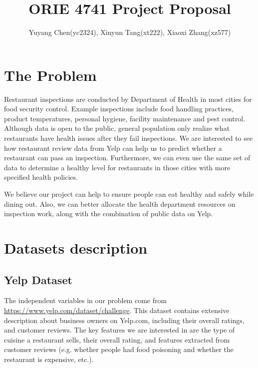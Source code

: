 \documentclass[12pt]{article}%
\begin{document}
\title{ORIE 4741 Project Proposal}
\author{Yuyang Chen(yc2324), Xinyun Tang(xt222), Xiaoxi Zhang(xz577)}
\date{}

\maketitle
\section{The Problem}
Restaurant inspections are conducted by Department of Health in most cities for food security control. Example inspections include food handling practices, product temperatures, personal hygiene, facility maintenance and pest control. Although data is open to the public, general population only realize what restaurants have health issues after they fail inspections. We are interested to see how restaurant review data from Yelp can help us to predict whether a restaurant can pass an inspection. Furthermore, we can even use the same set of data to determine a healthy level for restaurants in those cities with more specified health policies. 

We believe our project can help to ensure people can eat healthy and safely while dining out. Also, we can better allocate the health department resources on inspection work, along with the combination of public data on Yelp. 

\section{Datasets description}

\subsection{Yelp Dataset}
The independent variables in our problem come from \url{https://www.yelp.com/dataset/challenge}. This dataset contains extensive description about business owners on Yelp.com, including their overall ratings, and customer reviews. The key features we are interested in are the type of cuisine a restaurant sells, their overall rating, and features extracted from customer reviews (e.g. whether people had food poisoning and whether the restaurant is expensive, etc.).  
\end{document}

